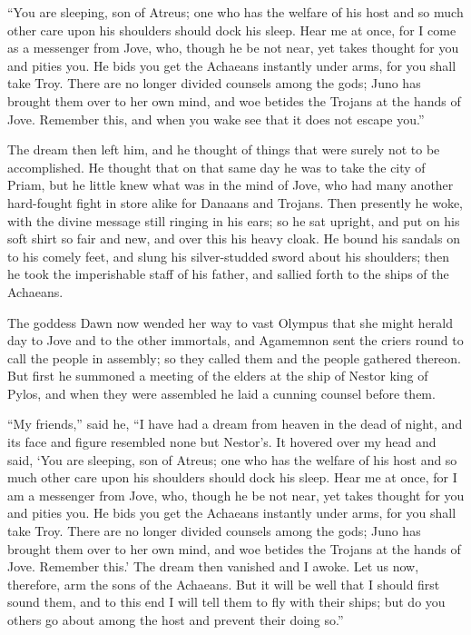 “You are sleeping, son of Atreus; one who has the welfare of his host and
so much other care upon his shoulders should dock his sleep. Hear me at
once, for I come as a messenger from Jove, who, though he be not near, yet
takes thought for you and pities you. He bids you get the Achaeans
instantly under arms, for you shall take Troy. There are no longer divided
counsels among the gods; Juno has brought them over to her own mind, and
woe betides the Trojans at the hands of Jove. Remember this, and when you
wake see that it does not escape you.”

The dream then left him, and he thought of things that were surely not to
be accomplished. He thought that on that same day he was to take the city
of Priam, but he little knew what was in the mind of Jove, who had many
another hard-fought fight in store alike for Danaans and Trojans. Then
presently he woke, with the divine message still ringing in his ears; so
he sat upright, and put on his soft shirt so fair and new, and over this
his heavy cloak. He bound his sandals on to his comely feet, and slung his
silver-studded sword about his shoulders; then he took the imperishable
staff of his father, and sallied forth to the ships of the Achaeans.

The goddess Dawn now wended her way to vast Olympus that she might herald
day to Jove and to the other immortals, and Agamemnon sent the criers
round to call the people in assembly; so they called them and the people
gathered thereon. But first he summoned a meeting of the elders at the
ship of Nestor king of Pylos, and when they were assembled he laid a
cunning counsel before them.

“My friends,” said he, “I have had a dream from heaven in the dead of
night, and its face and figure resembled none but Nestor’s. It hovered
over my head and said, ‘You are sleeping, son of Atreus; one who has the
welfare of his host and so much other care upon his shoulders should dock
his sleep. Hear me at once, for I am a messenger from Jove, who, though he
be not near, yet takes thought for you and pities you. He bids you get the
Achaeans instantly under arms, for you shall take Troy. There are no
longer divided counsels among the gods; Juno has brought them over to her
own mind, and woe betides the Trojans at the hands of Jove. Remember
this.’ The dream then vanished and I awoke. Let us now, therefore, arm the
sons of the Achaeans. But it will be well that I should first sound them,
and to this end I will tell them to fly with their ships; but do you
others go about among the host and prevent their doing so.”

